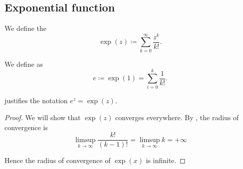\subsection{Exponential function}\label{subsec:exponential_function}

\begin{definition}\label{def:exponential_function}
  We define the 
  \begin{equation}\label{def:exponential_function/series}
    \exp(z) \coloneqq \sum_{k=0}^\infty \frac {z^k} {k!}.
  \end{equation}

  We define  as
  \begin{equation*}
    e \coloneqq \exp(1) = \sum_{i=0}^k \frac 1 {k!}.
  \end{equation*}

   justifies the notation \( e^z = \exp(z) \).
\end{definition}
\begin{proof}
  We will show that \( \exp(z) \) converges everywhere. By , the radius of convergence is
  \begin{equation*}
    \limsup_{k \to \infty} \frac {k!} {(k-1)!}
    =
    \limsup_{k \to \infty} k
    =
    +\infty
  \end{equation*}

  Hence the radius of convergence of \( \exp(x) \) is infinite.
\end{proof}

